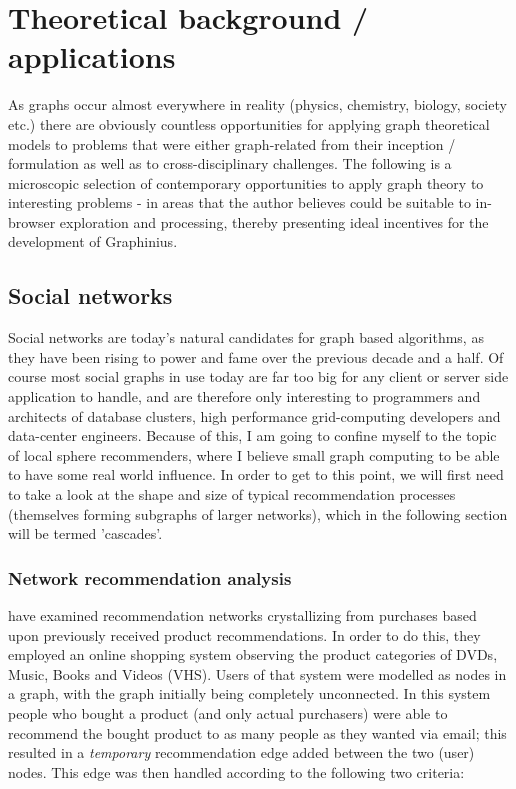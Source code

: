 \chapter{Theoretical background / applications}
\label{ch:applications}

	As graphs occur almost everywhere in reality (physics, chemistry, biology, society etc.) there are obviously countless opportunities for applying graph theoretical models to problems that were either graph-related from their inception / formulation as well as to cross-disciplinary challenges. The following is a microscopic selection of contemporary opportunities to apply graph theory to interesting problems - in areas that the author believes could be suitable to in-browser exploration and processing, thereby presenting ideal incentives for the development of Graphinius.


	\section{Social networks}
	\label{sect:social_networks}
	
	Social networks are today's natural candidates for graph based algorithms, as they have been rising to power and fame over the previous decade and a half. Of course most social graphs in use today are far too big for any client or server side application to handle, and are therefore only interesting to programmers and architects of database clusters, high performance grid-computing developers and data-center engineers. Because of this, I am going to confine myself to the topic of local sphere recommenders, where I believe small graph computing to be able to have some real world influence. In order to get to this point, we will first need to take a look at the shape and size of typical recommendation processes (themselves forming subgraphs of larger networks), which in the following section will be termed 'cascades'.
	
		
		\subsection{Network recommendation analysis}
		\label{ssect:net_rec_anal}
		
		\citet{RecCascades} have examined recommendation networks crystallizing from purchases based upon previously received product recommendations. In order to do this, they employed an online shopping system observing the product categories of DVDs, Music, Books and Videos (VHS). Users of that system were modelled as nodes in a graph, with the graph initially being completely unconnected. In this system people who bought a product (and only actual purchasers) were able to recommend the bought product to as many people  as they wanted via email; this resulted in a \textit{temporary} recommendation edge added between the two (user) nodes. This edge was then handled according to the following two criteria:
		

